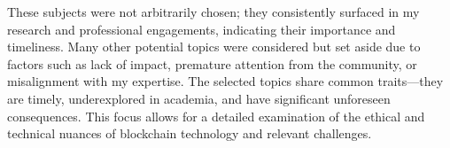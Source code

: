 




These subjects were not arbitrarily chosen; they consistently surfaced in my research and professional engagements, indicating their importance and timeliness. Many other potential topics were considered but set aside due to factors such as lack of impact, premature attention from the community, or misalignment with my expertise. The selected topics share common traits—they are timely, underexplored in academia, and have significant unforeseen consequences. This focus allows for a detailed examination of the ethical and technical nuances of blockchain technology and relevant challenges.



